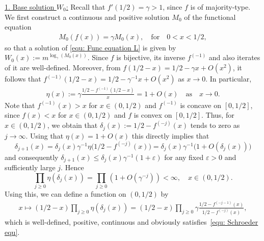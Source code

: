 \documentclass[11pt]{article}
\numberwithin{theorem}{section}
\begin{document}
\noindent
\underline{1. Base solution $W_0$:} Recall that $f'(1/2)=\gamma > 1$, since $f$ is of majority-type. We first construct a continuous and positive solution $M_0$ of the functional equation 
\begin{align}\label{equ: Schroeder equ}
M_0(f(x)) = \gamma M_0(x),
\quad\text{for}\quad 
0<x<1/2,
\end{align}
so that a solution of \eqref{equ: Func equation L} is given by
$
W_0(x):=m^{\log_{\gamma}(M_0(x))}.
$
Since $f$ is bijective, its inverse $f^{(-1)}$ and also iterates of it are well-defined.
Moreover, from $f(1/2-x) = 1/2 - \gamma x + O(x^2)$, it follows that $f^{(-1)}(1/2-x)=1/2-\gamma^{-1}x+O(x^2)$ as $x\to0$. In particular,
\begin{align}\label{equ: eta}
\eta(x):=\gamma\frac{1/2-f^{(-1)}(1/2-x)}{x} = 1+ O(x) 
\quad\text{as}\quad
x\to 0.
\end{align}
Note that $f^{(-1)}(x)>x$ for $x\in (0,1/2)$ and $f^{(-1)}$ is concave on $[0,1/2]$, since $f(x)<x$ for $x\in (0,1/2)$ and $f$ is convex on $[0,1/2]$. Thus, for $x\in (0,1/2)$, 
we obtain that $\delta_j(x):=1/2-f^{(-j)}(x)$ tends to zero as $j\to \infty$. Using that $\eta(x) = 1 + O(x)$ this directly implies that
\begin{equation}
\label{eq:deltaj+1deltaj}
    \delta_{j+1}(x)
    = \delta_j(x) \gamma^{-1} \eta\big(1/2 - f^{(-j)}(x)\big)
    = \delta_j(x)\gamma^{-1}\big(1+O(\delta_j(x))\big)
\end{equation}
and consequently $\delta_{j+1}(x)\leq \delta_j(x)\gamma^{-1}(1+\varepsilon)$ for any fixed $\varepsilon>0$ and sufficiently large $j$. Hence
\[
    \prod_{j\geq 0} \eta(\delta_j(x)) = \prod_{j\geq 0} (1+O(\gamma^{-j})) <\infty,
    \quad x \in (0,1/2).
\]
Using this, we can define a function on $(0,1/2)$ by
\begin{align*}
    x \mapsto (1/2-x)\prod_{j\geq 0} \eta(\delta_j(x))
    = (1/2-x)\prod_{j\geq 0} \gamma \frac{1/2 - f^{(-j-1)}(x)}{1/2 - f^{(-j)}(x)}
    , 
\end{align*}
which is well-defined, positive, continuous and obviously satisfies~\eqref{equ: Schroeder equ}.
\end{document}
